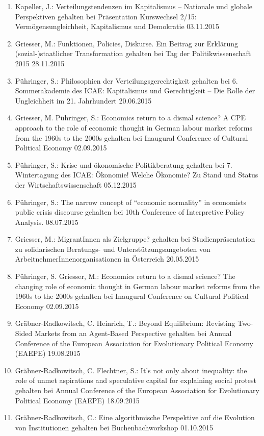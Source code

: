 \begin{enumerate}
	\item Kapeller, J.: Verteilungstendenzen im Kapitalismus -- Nationale und globale Perspektiven gehalten bei Präsentation Kurswechsel 2/15: Vermögensungleichheit, Kapitalismus und Demokratie 03.11.2015
	\item Griesser, M.: Funktionen, Policies, Diskurse. Ein Beitrag zur Erklärung (sozial-)staatlicher Transformation gehalten bei Tag der Politikwissenschaft 2015 28.11.2015
	\item Pühringer, S.: Philosophien der Verteilungsgerechtigkeit gehalten bei 6. Sommerakademie des ICAE: Kapitalismus und Gerechtigkeit -- Die Rolle der Ungleichheit im 21. Jahrhundert 20.06.2015
	\item Griesser, M. Pühringer, S.: Economics return to a dismal science? A CPE approach to the role of economic thought in German labour market reforms from the 1960s to the 2000s gehalten bei Inaugural Conference of Cultural Political Economy 02.09.2015
	\item Pühringer, S.: Krise und ökonomische Politikberatung gehalten bei 7. Wintertagung des ICAE: Ökonomie! Welche Ökonomie? Zu Stand und Status der Wirtschaftswissenschaft 05.12.2015
	\item Pühringer, S.: The narrow concept of “economic normality” in economists public crisis discourse gehalten bei 10th Conference of Interpretive Policy Analysis. 08.07.2015
	\item Griesser, M.: MigrantInnen als Zielgruppe? gehalten bei Studienpräsentation zu solidarischen Beratungs- und Unterstützungsangeboten von ArbeitnehmerInnenorganisationen in Österreich 20.05.2015
	\item Pühringer, S. Griesser, M.: Economics return to a dismal science? The changing role of economic thought in German labour market reforms from the 1960s to the 2000s gehalten bei Inaugural Conference on Cultural Political Economy 02.09.2015
	\item Gräbner-Radkowitsch, C. Heinrich, T.: Beyond Equilibrium: Revisting Two-Sided Markets from an Agent-Based Perspective gehalten bei Annual Conference of the European Association for Evolutionary Political Economy (EAEPE) 19.08.2015
	\item Gräbner-Radkowitsch, C. Flechtner, S.: It’s not only about inequality: the role of unmet aspirations and speculative capital for explaining social protest gehalten bei Annual Conference of the European Association for Evolutionary Political Economy (EAEPE) 18.09.2015
	\item Gräbner-Radkowitsch, C.: Eine algorithmische Perspektive auf die Evolution von Institutionen gehalten bei Buchenbachworkshop 01.10.2015

\end{enumerate}
